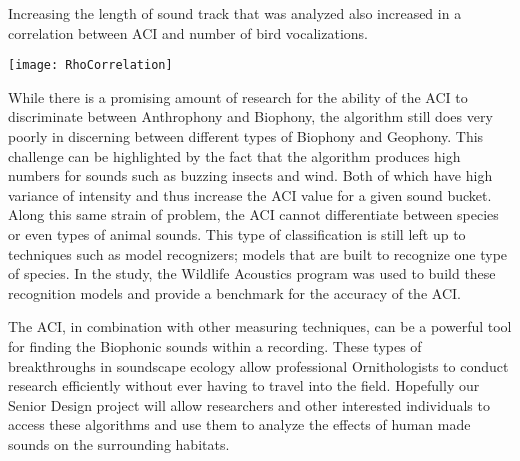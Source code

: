 Increasing the length of sound track that was analyzed also increased in a correlation between ACI and number of bird vocalizations.

\begin{center}
  \texttt{[image: RhoCorrelation]} \\[12pt]
\end{center}

\par While there is a promising amount of research for the ability of the ACI to discriminate between Anthrophony and Biophony, the algorithm still does very poorly in discerning between different types of Biophony and Geophony. This challenge can be highlighted by the fact that the algorithm produces high numbers for sounds such as buzzing insects and wind. Both of which have high variance of intensity and thus increase the ACI value for a given sound bucket. Along this same strain of problem, the ACI cannot differentiate between species or even types of animal sounds. This type of classification is still left up to techniques such as model recognizers; models that are built to recognize one type of species. In the study, the Wildlife Acoustics program was used to build these recognition models and provide a benchmark for the accuracy of the ACI.
\par The ACI, in combination with other measuring techniques, can be a powerful tool for finding the Biophonic sounds within a recording. These types of breakthroughs in soundscape ecology allow professional Ornithologists to conduct research efficiently without ever having to travel into the field. Hopefully our Senior Design project will allow researchers and other interested individuals to access these algorithms and use them to analyze the effects of human made sounds on the surrounding habitats.\cite{pieretti}
